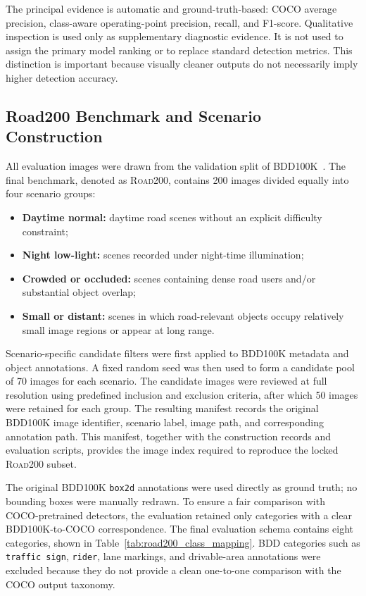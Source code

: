 \documentclass[runningheads]{llncs}
\begin{document}
The principal evidence is automatic and ground-truth-based: COCO average precision, class-aware operating-point precision, recall, and F1-score. Qualitative inspection is used only as supplementary diagnostic evidence. It is not used to assign the primary model ranking or to replace standard detection metrics. This distinction is important because visually cleaner outputs do not necessarily imply higher detection accuracy.

\subsection{Road200 Benchmark and Scenario Construction}

All evaluation images were drawn from the validation split of BDD100K~\cite{yu2020bdd100k}. The final benchmark, denoted as \textsc{Road200}, contains 200 images divided equally into four scenario groups:

\begin{itemize}
\item \textbf{Daytime normal:} daytime road scenes without an explicit difficulty constraint;
\item \textbf{Night low-light:} scenes recorded under night-time illumination;
\item \textbf{Crowded or occluded:} scenes containing dense road users and/or substantial object overlap;
\item \textbf{Small or distant:} scenes in which road-relevant objects occupy relatively small image regions or appear at long range.
\end{itemize}

Scenario-specific candidate filters were first applied to BDD100K metadata and object annotations. A fixed random seed was then used to form a candidate pool of 70 images for each scenario. The candidate images were reviewed at full resolution using predefined inclusion and exclusion criteria, after which 50 images were retained for each group. The resulting manifest records the original BDD100K image identifier, scenario label, image path, and corresponding annotation path. This manifest, together with the construction records and evaluation scripts, provides the image index required to reproduce the locked \textsc{Road200} subset.

The original BDD100K \texttt{box2d} annotations were used directly as ground truth; no bounding boxes were manually redrawn. To ensure a fair comparison with COCO-pretrained detectors, the evaluation retained only categories with a clear BDD100K-to-COCO correspondence. The final evaluation schema contains eight categories, shown in Table~\ref{tab:road200_class_mapping}. BDD categories such as \texttt{traffic sign}, \texttt{rider}, lane markings, and drivable-area annotations were excluded because they do not provide a clean one-to-one comparison with the COCO output taxonomy.
\end{document}

